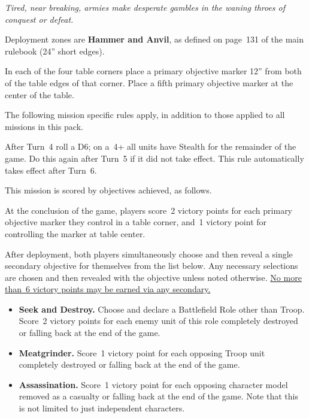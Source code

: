 
\centerline{\emph{Tired, near breaking, armies make desperate gambles
    in the waning throes of conquest or defeat.}}


Deployment zones are \textbf{Hammer and Anvil}, as defined on page~131
of the main rulebook (24'' short edges).

\bigskip%
In each of the four table corners place a primary objective marker
12'' from both of the table edges of that corner.  Place a fifth
primary objective marker at the center of the table.


The following mission specific rules apply, in addition to those
applied to all missions in this pack.

  After Turn~4 roll a D6; on a~4+
all units have Stealth for the remainder of the game.  Do this again
after Turn~5 if it did not take effect.  This rule automatically takes
effect after Turn~6.



This mission is scored by objectives achieved, as follows.

 At the conclusion of the game,
players score~2 victory points for each primary objective marker they
control in a table corner, and~1 victory point for controlling the
marker at table center.




After deployment, both players simultaneously choose and then reveal a
single secondary objective for themselves from the list below.  Any
necessary selections are chosen and then revealed with the objective
unless noted otherwise.  \underline{No more than~6 victory points may
  be earned via any secondary.}

\begin{itemize}
\item \textbf{Seek and Destroy.}  Choose and declare a Battlefield
  Role other than Troop.  Score~2 victory points for each enemy unit
  of this role completely destroyed or falling back at the end of the
  game.

\item \textbf{Meatgrinder.}  Score~1 victory point for each opposing
  Troop unit completely destroyed or falling back at the end of the
  game.

\item \textbf{Assassination.}  Score~1 victory point for each opposing
  character model removed as a casualty or falling back at the end of
  the game.  Note that this is not limited to just independent
  characters.

\end{itemize}


